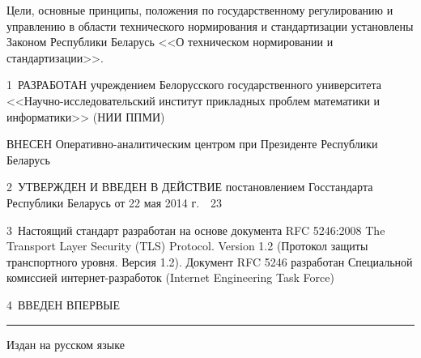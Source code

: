 Цели, основные принципы, положения по государственному регулированию и 
управлению в области технического нормирования и стандартизации 
установлены Законом Республики Беларусь <<О техническом нормировании и 
стандартизации>>.  

\vskip0.2cm

1~РАЗРАБОТАН учреждением Белорусского государственного университета 
<<Науч\-но-исследовательский  институт прикладных проблем математики и 
информатики>> (НИИ ППМИ)

ВНЕСЕН Оперативно-аналитическим центром при Президенте Республики Беларусь 

2~УТВЕРЖДЕН И ВВЕДЕН В ДЕЙСТВИЕ постановлением Госстандарта Республики 
Беларусь от 22 мая 2014 г.~\No~23

3~Настоящий стандарт разработан на основе документа RFC 5246:2008 The 
Transport Layer Security (TLS) Protocol. Version 1.2 (Протокол защиты 
транспортного уровня. Версия 1.2). Документ RFC 5246 разработан 
Специальной комиссией интернет-разработок (Internet Engineering Task 
Force)

4~ВВЕДЕН ВПЕРВЫЕ

\vfill
\hrule
\vskip1mm
Издан на русском языке

\pagebreak
